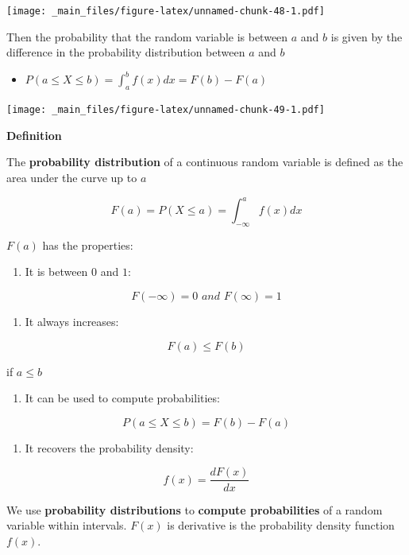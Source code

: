 \documentclass[
]{book}
\providecommand{\tightlist}{%
  \setlength{\itemsep}{0pt}\setlength{\parskip}{0pt}}
\begin{document}
\texttt{[image: \_main\_files/figure-latex/unnamed-chunk-48-1.pdf]}

Then the probability that the random variable is between \(a\) and \(b\) is given by the difference in the probability distribution between \(a\) and \(b\)

\begin{itemize}
\tightlist
\item
  \(P(a\leq X \leq b) = \int_a^b f(x)dx=F(b)-F(a)\)
\end{itemize}

\texttt{[image: \_main\_files/figure-latex/unnamed-chunk-49-1.pdf]}

\textbf{Definition}

The \textbf{probability distribution} of a continuous random variable is defined as the area under the curve up to \(a\)

\[F(a)=P(X\leq a) =\int_{-\infty} ^a f(x)dx\]

\(F(a)\) has the properties:

\begin{enumerate}
\def\labelenumi{\arabic{enumi})}
\tightlist
\item
  It is between \(0\) and \(1\):
\end{enumerate}

\[F(-\infty)= 0 \,\, and \,\,F(\infty)=1\]

\begin{enumerate}
\def\labelenumi{\arabic{enumi})}
\setcounter{enumi}{1}
\tightlist
\item
  It always increases:
\end{enumerate}

\[F(a)\leq F(b)\]

if \(a\leq b\)

\begin{enumerate}
\def\labelenumi{\arabic{enumi})}
\setcounter{enumi}{2}
\tightlist
\item
  It can be used to compute probabilities:
\end{enumerate}

\[P(a \leq X \leq b)=F(b)-F(a)\]

\begin{enumerate}
\def\labelenumi{\arabic{enumi})}
\setcounter{enumi}{3}
\tightlist
\item
  It recovers the probability density:
\end{enumerate}

\[f(x)=\frac{dF(x)}{dx}\]

We use \textbf{probability distributions} to \textbf{compute probabilities} of a random variable within intervals. \(F(x)\) is derivative is the probability density function \(f(x)\).
\end{document}
